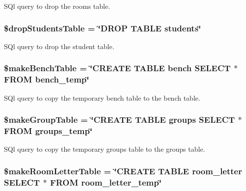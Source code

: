 \-S\-Ql query to drop the rooms table. \hypertarget{saveChanges_8php_a890bb7ba10da65398c02b972c41cf066}{
\subsubsection[{\$drop\-Students\-Table}]{\setlength{\rightskip}{0pt plus 5cm}\$drop\-Students\-Table = \char`\"{}\-D\-R\-O\-P \-T\-A\-B\-L\-E students\char`\"{}}}\label{saveChanges_8php_a890bb7ba10da65398c02b972c41cf066}
\-S\-Ql query to drop the student table. \hypertarget{saveChanges_8php_a2fe3590b8c0170965449809606284e4f}{
\subsubsection[{\$make\-Bench\-Table}]{\setlength{\rightskip}{0pt plus 5cm}\$make\-Bench\-Table = \char`\"{}\-C\-R\-E\-A\-T\-E \-T\-A\-B\-L\-E bench \-S\-E\-L\-E\-C\-T $\ast$ \-F\-R\-O\-M bench\-\_\-temp\char`\"{}}}\label{saveChanges_8php_a2fe3590b8c0170965449809606284e4f}
\-S\-Ql query to copy the temporary bench table to the bench table. \hypertarget{saveChanges_8php_abfd1f54ec496d2849f2540e4edda83ce}{
\subsubsection[{\$make\-Group\-Table}]{\setlength{\rightskip}{0pt plus 5cm}\$make\-Group\-Table = \char`\"{}\-C\-R\-E\-A\-T\-E \-T\-A\-B\-L\-E groups \-S\-E\-L\-E\-C\-T $\ast$ \-F\-R\-O\-M groups\-\_\-temp\char`\"{}}}\label{saveChanges_8php_abfd1f54ec496d2849f2540e4edda83ce}
\-S\-Ql query to copy the temporary groups table to the groups table. \hypertarget{saveChanges_8php_a1c26c6ec70102808c49bc495c147c649}{
\subsubsection[{\$make\-Room\-Letter\-Table}]{\setlength{\rightskip}{0pt plus 5cm}\$make\-Room\-Letter\-Table = \char`\"{}\-C\-R\-E\-A\-T\-E \-T\-A\-B\-L\-E room\-\_\-letter \-S\-E\-L\-E\-C\-T $\ast$ \-F\-R\-O\-M room\-\_\-letter\-\_\-temp\char`\"{}}}\label{saveChanges_8php_a1c26c6ec70102808c49bc495c147c649}
